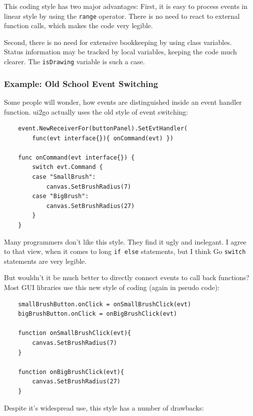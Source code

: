 This coding style has two major advantages: First, it is easy to process
events in linear style by using the \texttt{range} operator. There is no
need to react to external function calls, which makes the code very
legible.

Second, there is no need for extensive bookkeeping by using class
variables. Status information may be tracked by local variables, keeping
the code much clearer. The \texttt{isDrawing} variable is such a case.


\subsubsection*{Example: Old School Event Switching}

Some people will wonder, how events are distinguished inside an event
handler function. ui2go actually uses the old style of event switching:

\begin{verbatim}
    event.NewReceiverFor(buttonPanel).SetEvtHandler(
        func(evt interface{}){ onCommand(evt) })

    func onCommand(evt interface{}) {
        switch evt.Command {
        case "SmallBrush":
            canvas.SetBrushRadius(7)
        case "BigBrush":
            canvas.SetBrushRadius(27)
        }
    }
\end{verbatim}

Many programmers don't like this style. They find it ugly and inelegant.
I agree to that view, when it comes to long \texttt{if else} statements,
but I think Go \texttt{switch} statements are very legible.

But wouldn't it be much better to directly connect events to call back
functions? Most GUI libraries use this new style of coding (again in
pseudo code):

\begin{verbatim}
    smallBrushButton.onClick = onSmallBrushClick(evt)
    bigBrushButton.onClick = onBigBrushClick(evt)

    function onSmallBrushClick(evt){
        canvas.SetBrushRadius(7) 
    }

    function onBigBrushClick(evt){
        canvas.SetBrushRadius(27) 
    }
\end{verbatim}

Despite it's widespread use, this style has a number of drawbacks:

